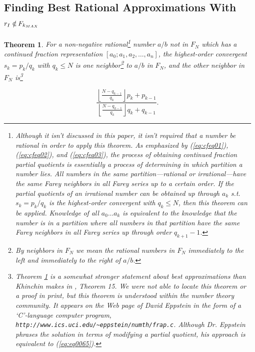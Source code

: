 \documentclass{esub2acm}
\newtheorem{mytheorem}{Theorem}
\begin{document}
\subsection{Finding Best Rational Approximations With $r_I \in \hspace{-0.85em} / \hspace{0.25em} F_{k_{MAX}}$}

\begin{mytheorem}
\label{thm:thm06}
For a non-negative rational\footnote{Although it isn't discussed in this
paper, it isn't required that a number be rational in order to apply this
theorem.  As emphasized by (\ref{eq:cfeq01}), (\ref{eq:cfeq02}), and (\ref{eq:cfeq03}),
the process of obtaining continued
fraction partial quotients is essentially a process of determining in which
partition a number lies.  All numbers in the same partition---rational or
irrational---have the same Farey neighbors in all Farey series up to a certain order.
If the partial quotients of
an irrational number can be obtained up through $a_k$ s.t. $s_k = p_k/q_k$ is the
highest-order convergent with $q_k \leq N$, then this theorem can be applied.
Knowledge of all $a_0 \ldots{} a_k$ is equivalent
to the knowledge that the number is in a partition where all numbers in that partition have
the same Farey neighbors in all Farey series up through order $q_{k+1}-1$.}
number $a/b$ not in
$F_N$ which has a
continued fraction representation
$[a_0;a_1,a_2,\ldots{} ,a_n]$, the
highest-order convergent $s_k = p_k/q_k$ with $q_k \leq N$ is one
neighbor\footnote{By neighbors in $F_N$ we mean the rational numbers
in $F_N$ immediately to the left and immediately to the right
of $a/b$.}
to $a/b$ in $F_N$, and the other neighbor in
$F_N$ is\footnote{Theorem \ref{thm:thm06}
is a somewhat stronger statement about best approximations
than Khinchin makes in \cite{KhinchinClassic}, Theorem 15.
We were not able to locate
this theorem or a proof in print,
but this theorem is understood within the number theory community.
It appears on the Web
page of David Eppstein in the form of a
`C'-language computer program,
\texttt{http://www.ics.uci.edu/\~{}{}eppstein/numth/frap.c}.
Although
Dr. Eppstein phrases the solution in terms of modifying
a partial quotient, his approach is equivalent to
(\ref{eq:eq0065}).}
\end{mytheorem}

\begin{equation}
\label{eq:eq0065}
\frac{{\displaystyle{\left\lfloor {\frac{{N - q_{k - 1} }}{{q_k }}} \right\rfloor}
 p_k  + p_{k - 1} }}{{\displaystyle{\left\lfloor {\frac{{N - q_{k - 1} }}{{q_k }}}
 \right\rfloor} q_k  + q_{k - 1} }}.
\end{equation}
\end{document}

